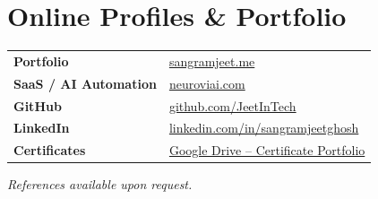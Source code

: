 \documentclass[11pt]{article}
\begin{document}
\section*{Online Profiles \& Portfolio}
\begin{tabularx}{\textwidth}{@{}l X@{}}
\textbf{Portfolio} & \href{https://www.sangramjeet.me}{sangramjeet.me} \\
\textbf{SaaS / AI Automation} & \href{https://neuroviai.com}{neuroviai.com} \\
\textbf{GitHub} & \href{https://github.com/JeetInTech}{github.com/JeetInTech} \\
\textbf{LinkedIn} & \href{https://www.linkedin.com/in/sangramjeetghosh}{linkedin.com/in/sangramjeetghosh} \\
\textbf{Certificates} & \href{https://drive.google.com/drive/folders/1ZQd-DeX-rXlEVDTwDJfjLjnG7iPc_fEw}{Google Drive -- Certificate Portfolio} \\
\end{tabularx}

\vfill
\begin{center}
\small\textit{References available upon request.}
\end{center}
\end{document}
